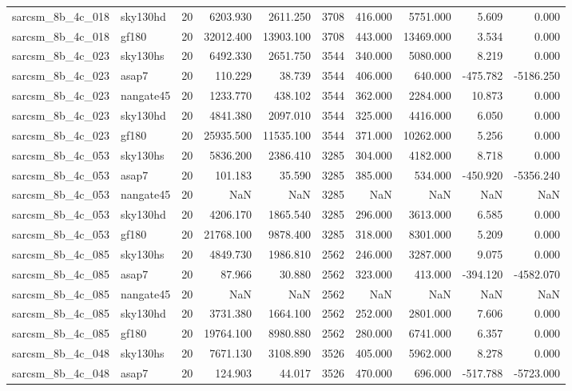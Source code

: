 \documentclass{article}
\begin{document}
\begin{longtable}{llrrrrrrrr}
sarcsm\_8b\_4c\_018 & sky130hd & 20 & 6203.930 & 2611.250 & 3708 & 416.000 & 5751.000 & 5.609 & 0.000 \\
sarcsm\_8b\_4c\_018 & gf180 & 20 & 32012.400 & 13903.100 & 3708 & 443.000 & 13469.000 & 3.534 & 0.000 \\
sarcsm\_8b\_4c\_023 & sky130hs & 20 & 6492.330 & 2651.750 & 3544 & 340.000 & 5080.000 & 8.219 & 0.000 \\
sarcsm\_8b\_4c\_023 & asap7 & 20 & 110.229 & 38.739 & 3544 & 406.000 & 640.000 & -475.782 & -5186.250 \\
sarcsm\_8b\_4c\_023 & nangate45 & 20 & 1233.770 & 438.102 & 3544 & 362.000 & 2284.000 & 10.873 & 0.000 \\
sarcsm\_8b\_4c\_023 & sky130hd & 20 & 4841.380 & 2097.010 & 3544 & 325.000 & 4416.000 & 6.050 & 0.000 \\
sarcsm\_8b\_4c\_023 & gf180 & 20 & 25935.500 & 11535.100 & 3544 & 371.000 & 10262.000 & 5.256 & 0.000 \\
sarcsm\_8b\_4c\_053 & sky130hs & 20 & 5836.200 & 2386.410 & 3285 & 304.000 & 4182.000 & 8.718 & 0.000 \\
sarcsm\_8b\_4c\_053 & asap7 & 20 & 101.183 & 35.590 & 3285 & 385.000 & 534.000 & -450.920 & -5356.240 \\
sarcsm\_8b\_4c\_053 & nangate45 & 20 & NaN & NaN & 3285 & NaN & NaN & NaN & NaN \\
sarcsm\_8b\_4c\_053 & sky130hd & 20 & 4206.170 & 1865.540 & 3285 & 296.000 & 3613.000 & 6.585 & 0.000 \\
sarcsm\_8b\_4c\_053 & gf180 & 20 & 21768.100 & 9878.400 & 3285 & 318.000 & 8301.000 & 5.209 & 0.000 \\
sarcsm\_8b\_4c\_085 & sky130hs & 20 & 4849.730 & 1986.810 & 2562 & 246.000 & 3287.000 & 9.075 & 0.000 \\
sarcsm\_8b\_4c\_085 & asap7 & 20 & 87.966 & 30.880 & 2562 & 323.000 & 413.000 & -394.120 & -4582.070 \\
sarcsm\_8b\_4c\_085 & nangate45 & 20 & NaN & NaN & 2562 & NaN & NaN & NaN & NaN \\
sarcsm\_8b\_4c\_085 & sky130hd & 20 & 3731.380 & 1664.100 & 2562 & 252.000 & 2801.000 & 7.606 & 0.000 \\
sarcsm\_8b\_4c\_085 & gf180 & 20 & 19764.100 & 8980.880 & 2562 & 280.000 & 6741.000 & 6.357 & 0.000 \\
sarcsm\_8b\_4c\_048 & sky130hs & 20 & 7671.130 & 3108.890 & 3526 & 405.000 & 5962.000 & 8.278 & 0.000 \\
sarcsm\_8b\_4c\_048 & asap7 & 20 & 124.903 & 44.017 & 3526 & 470.000 & 696.000 & -517.788 & -5723.000 \\

\end{longtable}
\end{document}
